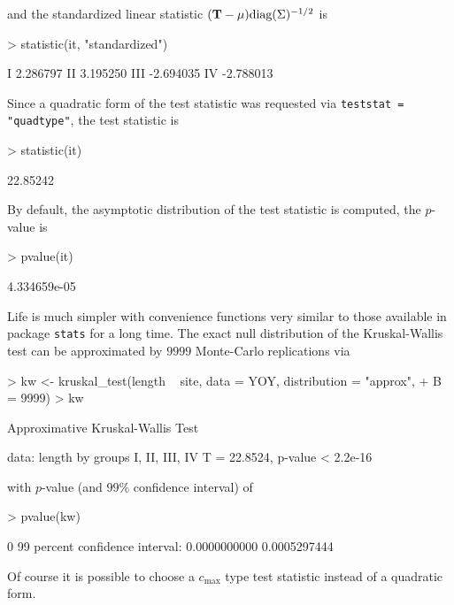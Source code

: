 \documentclass[letter]{article}
\begin{document}
and the standardized linear statistic $(\mathbf{T} - \mu)\text{diag}(\Sigma)^{-1/2}$
is
\begin{Schunk}
\begin{Sinput}
> statistic(it, "standardized")
\end{Sinput}
\begin{Soutput}
         [,1]
I    2.286797
II   3.195250
III -2.694035
IV  -2.788013
\end{Soutput}
\end{Schunk}
Since a quadratic form of the test statistic was requested via
\texttt{teststat = "quadtype"}, the test statistic is 
\begin{Schunk}
\begin{Sinput}
> statistic(it)
\end{Sinput}
\begin{Soutput}
[1] 22.85242
\end{Soutput}
\end{Schunk}
By default, the asymptotic distribution of the test statistic is computed,
the $p$-value is
\begin{Schunk}
\begin{Sinput}
> pvalue(it)
\end{Sinput}
\begin{Soutput}
[1] 4.334659e-05
\end{Soutput}
\end{Schunk}

Life is much simpler with convenience functions very similar to those
available in package \texttt{stats} for a long time. The exact
null distribution of the Kruskal-Wallis test can be approximated by $9999$
Monte-Carlo replications via
\begin{Schunk}
\begin{Sinput}
> kw <- kruskal_test(length ~ site, data = YOY, distribution = "approx", 
+     B = 9999)
> kw
\end{Sinput}
\begin{Soutput}
	Approximative Kruskal-Wallis Test

data:  length by groups I, II, III, IV 
T = 22.8524, p-value < 2.2e-16
\end{Soutput}
\end{Schunk}
with $p$-value (and $99\%$ confidence interval) of 
\begin{Schunk}
\begin{Sinput}
> pvalue(kw)
\end{Sinput}
\begin{Soutput}
[1] 0
99 percent confidence interval:
 0.0000000000 0.0005297444 
\end{Soutput}
\end{Schunk}
Of course it is possible to choose a $c_\text{max}$ type test statistic
instead of a quadratic form.
\end{document}
